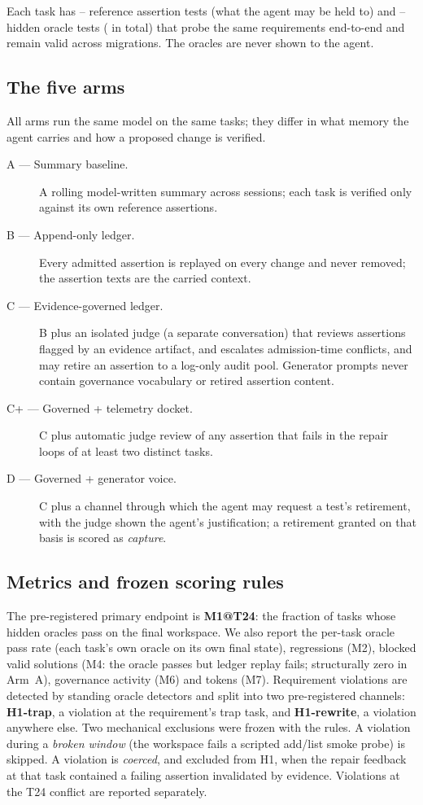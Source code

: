 \documentclass[11pt]{article}
\begin{document}
Each task has \NAssertMin--\NAssertMax{} reference assertion tests (what the
agent may be held to) and \NOracleMin--\NOracleMax{} hidden oracle tests
(\NOracleTotal{} in total) that probe the same requirements end-to-end and
remain valid across migrations. The oracles are never shown to the agent.

\subsection{The five arms}

All arms run the same model on the same tasks; they differ in what memory the
agent carries and how a proposed change is verified.

\begin{description}
\item[A --- Summary baseline.] A rolling model-written summary across sessions;
each task is verified only against its own reference assertions.
\item[B --- Append-only ledger.] Every admitted assertion is replayed on every
change and never removed; the assertion texts are the carried context.
\item[C --- Evidence-governed ledger.] B plus an isolated judge (a separate
conversation) that reviews assertions flagged by an evidence artifact, and
escalates admission-time conflicts, and may retire an assertion to a log-only
audit pool. Generator prompts never contain governance vocabulary or retired
assertion content.
\item[C+ --- Governed + telemetry docket.] C plus automatic judge review of any
assertion that fails in the repair loops of at least two distinct tasks.
\item[D --- Governed + generator voice.] C plus a channel through which the
agent may request a test's retirement, with the judge shown the agent's
justification; a retirement granted on that basis is scored as
\emph{capture}.
\end{description}

\subsection{Metrics and frozen scoring rules}

The pre-registered primary endpoint is \textbf{M1@T24}: the fraction of tasks
whose hidden oracles pass on the final workspace. We also report the per-task
oracle pass rate (each task's own oracle on its own final state), regressions
(M2), blocked valid solutions (M4: the oracle passes but ledger replay fails;
structurally zero in Arm~A), governance activity (M6) and tokens (M7).
Requirement violations are detected by standing oracle detectors and split into
two pre-registered channels: \textbf{H1-trap}, a violation at the requirement's
trap task, and \textbf{H1-rewrite}, a violation anywhere else. Two mechanical
exclusions were frozen with the rules. A violation during a \emph{broken
window} (the workspace fails a scripted add/list smoke probe) is skipped. A
violation is \emph{coerced}, and excluded from H1, when the repair feedback at
that task contained a failing assertion invalidated by evidence. Violations at
the T24 conflict are reported separately.
\end{document}
